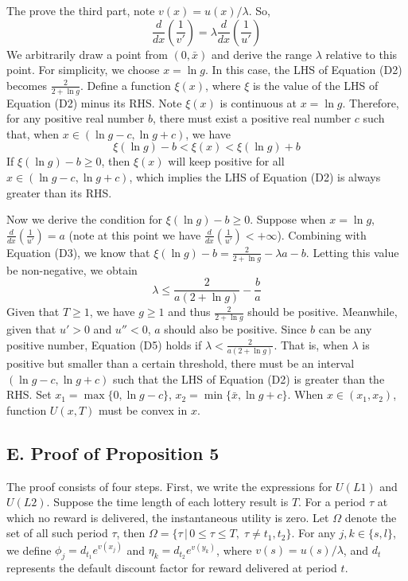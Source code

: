 \documentclass[
  12pt,
]{article}
\begin{document}
The prove the third part, note \(v(x)=u(x)/\lambda\). So, \[
\frac{d}{dx}\left(\frac{1}{v'}\right)=\lambda\frac{d}{dx}\left(\frac{1}{u'}\right)
\]We arbitrarily draw a point from \((0,\bar{x})\) and derive the range
\(\lambda\) relative to this point. For simplicity, we choose
\(x=\ln g\). In this case, the LHS of Equation (D2) becomes
\(\frac{2}{2+\ln g}\). Define a function \(\xi(x)\), where \(\xi\) is
the value of the LHS of Equation (D2) minus its RHS. Note \(\xi(x)\) is
continuous at \(x=\ln g\). Therefore, for any positive real number
\(b\), there must exist a positive real number \(c\) such that, when
\(x\in(\ln g-c,\ln g+c)\), we have\[\tag{D4}
\xi(\ln g)-b<\xi(x)<\xi(\ln g)+b
\]If \(\xi(\ln g)-b\geq 0\), then \(\xi(x)\) will keep positive for all
\(x\in(\ln g-c,\ln g+c)\), which implies the LHS of Equation (D2) is
always greater than its RHS.

Now we derive the condition for \(\xi(\ln g)-b\geq 0\). Suppose when
\(x=\ln g\), \(\frac{d}{dx}\left(\frac{1}{u'}\right)=a\) (note at this
point we have \(\frac{d}{dx}\left(\frac{1}{u'}\right)<+\infty\)).
Combining with Equation (D3), we know that
\(\xi(\ln g)-b =\frac{2}{2+\ln g}-\lambda a-b\). Letting this value be
non-negative, we obtain\[\tag{D5}
\lambda \leq \frac{2}{a(2+\ln g)}-\frac{b}{a}
\]Given that \(T\geq1\), we have \(g\geq 1\) and thus
\(\frac{2}{2+\ln g}\) should be positive. Meanwhile, given that \(u'>0\)
and \(u''<0\), \(a\) should also be positive. Since \(b\) can be any
positive number, Equation (D5) holds if
\(\lambda <\frac{2}{a(2+\ln g)}\). That is, when \(\lambda\) is positive
but smaller than a certain threshold, there must be an interval
\((\ln g-c,\ln g+c)\) such that the LHS of Equation (D2) is greater than
the RHS. Set \(x_1 = \max\{0,\ln g-c\}\),
\(x_2=\min\{\bar{x}, \ln g +c\}\). When \(x\in (x_1,x_2)\), function
\(U(x,T)\) must be convex in \(x\).

\hypertarget{e.-proof-of-proposition-5}{%
\subsection*{E. Proof of Proposition
5}\label{e.-proof-of-proposition-5}}

The proof consists of four steps. First, we write the expressions for
\(U(L1)\) and \(U(L2)\). Suppose the time length of each lottery result
is \(T\). For a period \(\tau\) at which no reward is delivered, the
instantaneous utility is zero. Let \(\Omega\) denote the set of all such
period \(\tau\), then
\(\Omega=\{\tau\,|\,0\leq\tau\leq T,\;\tau \neq t_1,t_2\}\). For any
\(j,k\in\{s,l\}\), we define \(\phi_j=d_{t_1}e^{v(x_j)}\) and
\(\eta_k=d_{t_2}e^{v(y_k)}\), where \(v(s)=u(s)/\lambda\), and \(d_t\)
represents the default discount factor for reward delivered at period
\(t\).
\end{document}
